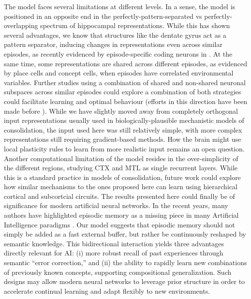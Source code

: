 \documentclass{article}
\begin{document}
The model faces several limitations at different levels. In a sense, the model is positioned in an opposite end in the perfectly-pattern-separated vs perfectly-overlapping spectrum of hippocampal representations. While this has shown several advantages, we know that structures like the dentate gyrus act as a pattern separator, inducing changes in representations even across similar episodes, as recently evidenced by episode-specific coding neurons in . At the same time, some representations are shared across different episodes, as evidenced by place cells and concept cells, when episodes have correlated environmental variables. Further studies using a combination of shared and non-shared neuronal subspaces across similar episodes could explore a combination of both strategies could facilitate learning and optimal behaviour (efforts in this direction have been made before ). While we have slightly moved away from completely orthogonal input representations usually used in biologically-plausible mechanistic models of consolidation, the input used here was still relatively simple, with more complex representations still requiring gradient-based methods. How the brain might use local plasticity rules to learn from more realistic input remains an open question. Another computational limitation of the model resides in the over-simplicity of the different regions, studying CTX and MTL as single recurrent layers. While this is a standard practice in models of consolidation, future work could explore how similar mechanisms to the ones proposed here can learn using hierarchical cortical and subcortcial circuits.
\newline\newline
The results presented here could finally be of significance for modern artificial neural networks. In the recent years, many authors have highlighted episodic memory as a missing piece in many Artificial Intelligence paradigms .  Our model suggests that episodic memory should not simply be added as a fast external buffer, but rather be continuously reshaped by semantic knowledge. This bidirectional interaction yields three advantages directly relevant for AI: (i) more robust recall of past experiences through semantic “error correction,” and (ii) the ability to rapidly learn new combinations of previously known concepts, supporting compositional generalization. Such designs may allow modern neural networks to leverage prior structure in order to accelerate continual learning and adapt flexibly to new environments.
\newpage
\end{document}
